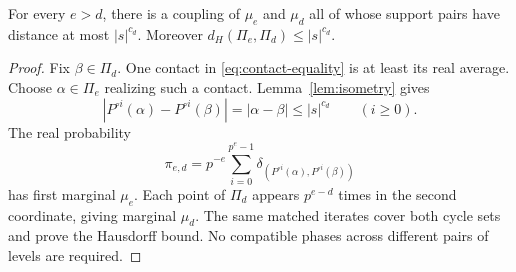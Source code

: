 \begin{corollary}\label{cor:coupling}
For every $e>d$, there is a coupling of $\mu_e$ and $\mu_d$ all
of whose support pairs have distance at most $|s|^{c_d}$.
Moreover $d_H(\Pi_e,\Pi_d)\le|s|^{c_d}$.
\end{corollary}
\begin{proof}
Fix $\beta\in\Pi_d$. One contact in
\eqref{eq:contact-equality} is at least its real average. Choose
$\alpha\in\Pi_e$ realizing such a contact. Lemma~\ref{lem:isometry}
gives
\[
 |P^{\circ i}(\alpha)-P^{\circ i}(\beta)|
 =|\alpha-\beta|\le |s|^{c_d}\qquad(i\ge0).
\]
The real probability
\begin{equation}\label{eq:aligned-coupling}
 \pi_{e,d}=p^{-e}\sum_{i=0}^{p^e-1}
    \delta_{(P^{\circ i}(\alpha),P^{\circ i}(\beta))}
\end{equation}
has first marginal $\mu_e$. Each point of $\Pi_d$ appears
$p^{e-d}$ times in the second coordinate, giving marginal $\mu_d$.
The same matched iterates cover both cycle sets and prove the
Hausdorff bound. No compatible phases across different pairs of
levels are required.
\end{proof}
